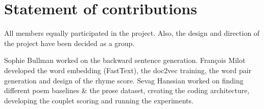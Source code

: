 \documentclass[11pt,a4paper]{article}
\begin{document}
\section{Statement of contributions}
\label{sec:contributions}
All members equally participated in the project. Also, the design and direction of the project have been decided as a group. 

Sophie Bullman worked on the backward sentence generation. François Milot developed the word embedding (FastText), the doc2vec training, the word pair generation and design of the rhyme score. Sevag Hanssian worked on finding different poem baselines \& the prose dataset, creating the coding architecture, developing the couplet scoring and running the experiments.



\end{document}
